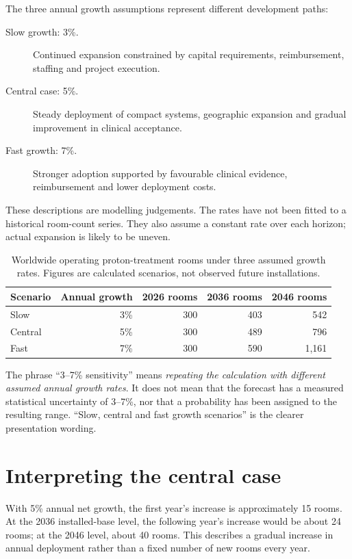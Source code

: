\documentclass[11pt,a4paper]{article}
\begin{document}
The three annual growth assumptions represent different development paths:
\begin{description}
\item[Slow growth: 3\%.] Continued expansion constrained by capital requirements,
reimbursement, staffing and project execution.
\item[Central case: 5\%.] Steady deployment of compact systems, geographic
expansion and gradual improvement in clinical acceptance.
\item[Fast growth: 7\%.] Stronger adoption supported by favourable clinical
evidence, reimbursement and lower deployment costs.
\end{description}

These descriptions are modelling judgements. The rates have not been fitted to
a historical room-count series. They also assume a constant rate over each
horizon; actual expansion is likely to be uneven.

\begin{table}[htbp]
\centering
\begin{tabular}{lrrrr}
\toprule
Scenario & Annual growth & 2026 rooms & 2036 rooms & 2046 rooms\\
\midrule
Slow & 3\% & 300 & 403 & 542\\
Central & 5\% & 300 & 489 & 796\\
Fast & 7\% & 300 & 590 & 1,161\\
\bottomrule
\end{tabular}
\caption{Worldwide operating proton-treatment rooms under three assumed growth
rates. Figures are calculated scenarios, not observed future installations.}
\end{table}

The phrase ``3--7\% sensitivity'' means \emph{repeating the calculation with
different assumed annual growth rates}. It does not mean that the forecast has
a measured statistical uncertainty of 3--7\%, nor that a probability has been
assigned to the resulting range. ``Slow, central and fast growth scenarios'' is
the clearer presentation wording.

\section{Interpreting the central case}

With 5\% annual net growth, the first year's increase is approximately 15 rooms.
At the 2036 installed-base level, the following year's increase would be about
24 rooms; at the 2046 level, about 40 rooms. This describes a gradual increase
in annual deployment rather than a fixed number of new rooms every year.
\end{document}
